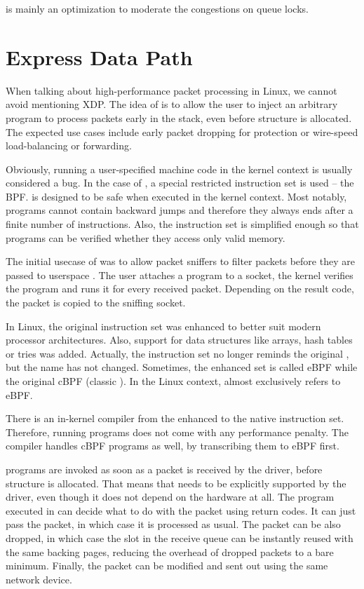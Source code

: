  is mainly an optimization to moderate the congestions on queue locks.

\section{Express Data Path}
\label{sec:xdp}

When talking about high-performance packet processing in Linux, we cannot avoid
mentioning \acrfull{XDP}. The idea of  is to allow the user to inject an
arbitrary program to process packets early in the stack, even before \skb{}
structure is allocated. The expected use cases include early packet dropping
for  protection or wire-speed load-balancing or forwarding.

Obviously, running a user-specified machine code in the kernel context is
usually considered a bug. In the case of , a special restricted
instruction set is used -- the \acrlong{BPF}.  is designed to be safe when
executed in the kernel context. Most notably,  programs cannot contain
backward jumps and therefore they always ends after a finite number of
instructions. Also, the instruction set is simplified enough so that programs
can be verified whether they access only valid memory.

The initial usecase of  was to allow packet sniffers to filter packets
before they are passed to userspace \cite{bpf-usenix}. The user attaches
a  program to a socket, the kernel verifies the program and runs it
for every received packet. Depending on the result code, the packet is copied
to the sniffing socket.

In Linux, the original  instruction set was enhanced to better suit modern
processor architectures. Also, support for data structures like arrays, hash
tables or tries was added. Actually, the instruction set no longer reminds the original ,
but the name has not changed. Sometimes, the enhanced set is called eBPF while
the original cBPF (classic ). In the Linux context,  almost
exclusively refers to eBPF.

There is an in-kernel  compiler from the enhanced  to the native
instruction set. Therefore, running  programs does not come with any
performance penalty. The compiler handles cBPF programs as well, by
transcribing them to eBPF first.

 programs are invoked as soon as a packet is received by the driver,
before \skb{} structure is allocated. That means that  needs to be
explicitly supported by the driver, even though it does not depend on the hardware at all.
The program executed in  can decide what to do with the packet using return codes.
It can just pass the packet, in which case it is processed as usual. The packet
can be also dropped, in which case the slot in the receive queue can be instantly reused
with the same backing pages, reducing the overhead of dropped packets to a bare
minimum. Finally, the packet can be modified and sent out using the same
network device.

